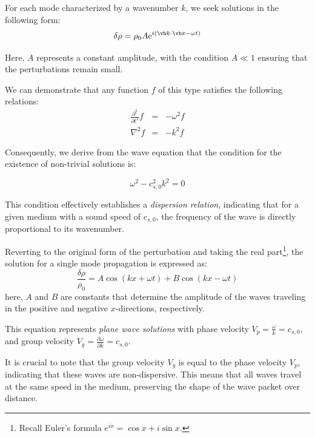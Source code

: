 For each mode characterized by a wavenumber \( k \), we seek solutions in the following form:
%
\begin{equation}
\delta \rho = \rho_0 A {\rm e}^{i(\vb k \cdot \vb x - \omega t)}
\end{equation}

Here, \( A \) represents a constant amplitude, with the condition \( A \ll 1 \) ensuring that the perturbations remain small.

We can demonstrate that any function \( f \) of this type satisfies the following relations:
%
\begin{eqnarray}
\frac{\partial^2}{\partial t^2} f & = & - \omega^2 f \\
\nabla^2 f & = & -k^2 f
\end{eqnarray}

Consequently, we derive from the wave equation that the condition for the existence of non-trivial solutions is:
%
\begin{remark}
\begin{equation}
\omega^2 - c_{s,0}^2 k^2 = 0
\end{equation}
\end{remark}

This condition effectively establishes a \emph{dispersion relation}, indicating that for a given medium with a sound speed of \( c_{s,0} \), the frequency of the wave is directly proportional to its wavenumber. 

Reverting to the original form of the perturbation and taking the real part\footnote{Recall Euler's formula \( e^{ix} = \cos x + i \sin x \).}, the solution for a single mode propagation is expressed as:
%
\begin{equation}
\frac{\delta \rho}{\rho_0} = A \cos(kx + \omega t) + B \cos(kx - \omega t) 
\end{equation}
%
here, \( A \) and \( B \) are constants that determine the amplitude of the waves traveling in the positive and negative \( x \)-directions, respectively.

This equation represents \emph{plane wave solutions} with phase velocity \( V_p = \frac{\omega}{k} = c_{s,0} \), and group velocity \( V_g = \frac{\partial \omega}{\partial k} = c_{s,0} \).

It is crucial to note that the group velocity \( V_g \) is equal to the phase velocity \( V_p \), indicating that these waves are non-dispersive. This means that all waves travel at the same speed in the medium, preserving the shape of the wave packet over distance.

